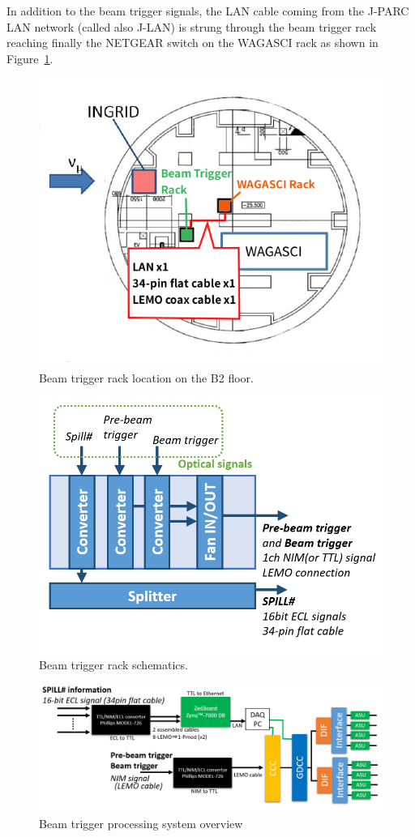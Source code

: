 In addition to the beam trigger signals, the LAN cable coming from the J-PARC
LAN network (called also J-LAN) is strung through the beam trigger rack reaching
finally the NETGEAR switch on the WAGASCI rack as shown in
Figure~\ref{fig:beam-trigger-optical-location}.
\begin{figure}[H]
  \centering
  \includegraphics[width=0.6\linewidth]{beam-trigger-optical-location}
  \caption{Beam trigger rack location on the B2
    floor.}\label{fig:beam-trigger-optical-location}
\end{figure}
\begin{figure}[H]
  \centering
  \includegraphics[width=0.6\linewidth]{beam-trigger-optical-schematics}
  \caption{Beam trigger rack
    schematics.}\label{fig:beam-trigger-optical-schematics}
\end{figure}
\begin{figure}[H]
  \centering \includegraphics[width=\linewidth]{beam-trigger}
  \caption{Beam trigger processing system overview}\label{fig:beam-trigger}
\end{figure}
